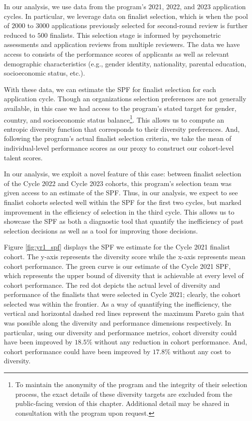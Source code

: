 In our analysis, we use data from the program's 2021, 2022, and 2023 application cycles. In particular, we leverage data on finalist selection, which is when the pool of $2000$ to $3000$ applications previously selected for second-round review is further reduced to $500$ finalists. This selection stage is informed by psychometric assessments and application reviews from multiple reviewers. The data we have access to consists of the performance scores of applicants as well as relevant demographic characteristics (e.g., gender identity, nationality, parental education, socioeconomic status, etc.). 

With these data, we can estimate the SPF for finalist selection for each application cycle. Though an organizations selection preferences are not generally available, in this case we had
access to the program's stated target for gender, country, and socioeconomic status balance\footnote{To maintain the anonymity of the program and the integrity of their selection process, the exact details of these diversity targets are excluded from the public-facing version of this chapter. Additional detail may be shared in consultation with the program upon request.}. This allows us to compute an entropic diversity function that corresponds to their diversity preferences. And, following the program's actual finalist selection criteria, we take the mean of individual-level performance scores as our proxy to construct our cohort-level talent scores. 

In our analysis, we exploit a novel feature of this case: between finalist selection of the Cycle 2022 and Cycle 2023 cohorts, this program's selection team was given access to an estimate of the SPF. Thus, in our analysis, we expect to see finalist cohorts selected well within the SPF for the first two cycles, but marked improvement in the efficiency of selection in the third cycle. This allows us to showcase the SPF as both a diagnostic tool that quantify the inefficiency of past selection decisions as well as a tool for improving those decisions. 

Figure \ref{fig:yr1_spf} displays the SPF we estimate for the Cycle 2021 finalist cohort. The y-axis represents the diversity score while the x-axis represents mean cohort performance. The green curve is our estimate of the Cycle 2021 SPF, which represents the upper bound of diversity that is achievable at every level of cohort performance. The red dot depicts the actual level of diversity and performance of the finalists that were selected in Cycle 2021; clearly, the cohort selected was within the frontier. As a way of quantifying the inefficiency, the vertical and horizontal dashed red lines represent the maximum Pareto gain that was possible along the diversity and performance dimensions respectively. In particular, using our diversity and performance metrics, cohort diversity could have been improved by $18.5\%$ without any reduction in cohort performance. And, cohort performance could have been improved by $17.8\%$ without any cost to diversity. 

